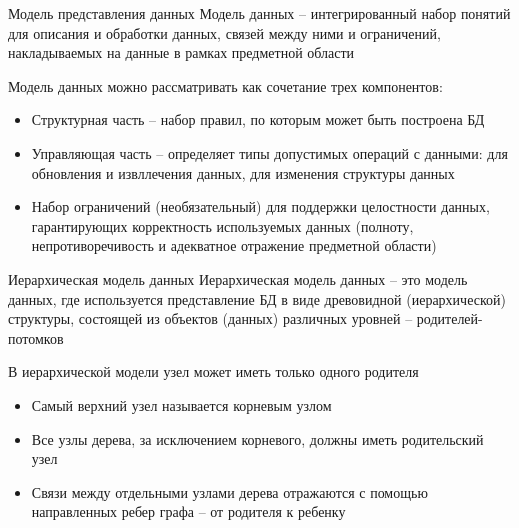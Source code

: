 \documentclass[12pt]{article}
\begin{document}
\begin{defin}{Модель представления данных}
    Модель данных -- интегрированный набор понятий для описания и обработки данных, связей между ними и ограничений, накладываемых на данные в рамках предметной области 

    Модель данных можно рассматривать как сочетание трех компонентов:

    \begin{itemize}
        \item Структурная часть -- набор правил, по которым может быть построена БД 
        \item Управляющая часть -- определяет типы допустимых операций с данными: для обновления и извллечения данных, для изменения структуры данных 
        \item Набор ограничений (необязательный) для поддержки целостности данных, гарантирующих корректность используемых данных (полноту, непротиворечивость и адекватное отражение предметной области)
    \end{itemize}
\end{defin}

\begin{defin}{Иерархическая модель данных}
    Иерархическая модель данных -- это модель данных, где используется представление БД в виде древовидной (иерархической) структуры, состоящей из объектов (данных) различных уровней -- родителей-потомков 

    В иерархической модели узел может иметь только одного родителя

    \begin{itemize}
        \item Самый верхний узел называется корневым узлом 
        \item Все узлы дерева, за исключением корневого, должны иметь родительский узел 
        \item Связи между отдельными узлами дерева отражаются с помощью направленных ребер графа -- от родителя к ребенку
    \end{itemize}
\end{defin}
\end{document}
